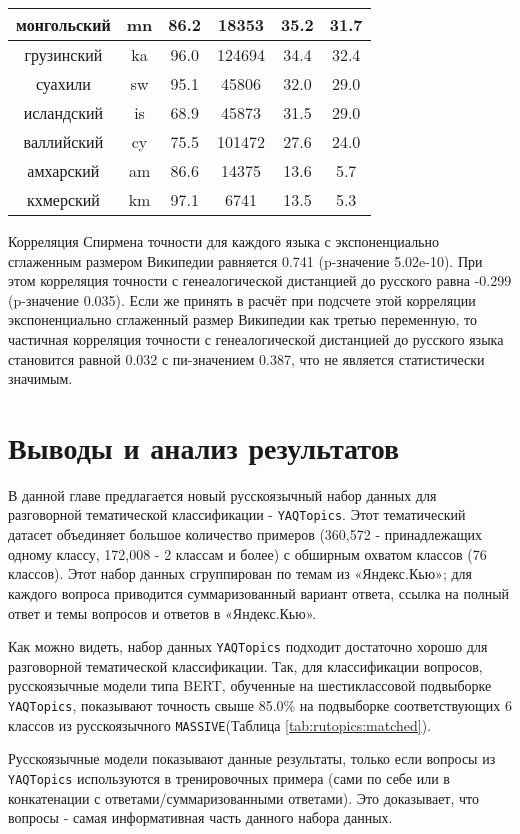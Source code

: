 \begin{table*}
{\begin{tabular}{|c|c|c||c|c|c|}
монгольский & mn & 86.2 & 18353 & 35.2 & 31.7\\ \hline
грузинский & ka & 96.0 & 124694 & 34.4 & 32.4\\ \hline
суахили & sw & 95.1 & 45806 & 32.0 & 29.0\\ \hline
исландский & is & 68.9 & 45873 & 31.5 & 29.0\\ \hline
валлийский & cy & 75.5 & 101472 & 27.6 & 24.0\\ \hline
амхарский & am & 86.6 & 14375 & 13.6 & 5.7\\ \hline
кхмерский & km & 97.1 & 6741 & 13.5 & 5.3\\ \hline
\end{tabular}
}
\end{table*}
Корреляция Спирмена точности для каждого языка с экспоненциально сглаженным размером Википедии равняется 0.741 (p-значение 5.02e-10). При этом корреляция точности с генеалогической дистанцией до русского равна -0.299 (p-значение 0.035). Если же принять в расчёт при подсчете этой корреляции экспоненциально сглаженный размер Википедии как третью переменную, то частичная корреляция точности с генеалогической дистанцией до русского языка становится равной 0.032 с пи-значением 0.387, что не является статистически значимым.


\section{Выводы и анализ результатов} 

В данной главе предлагается новый русскоязычный набор данных для разговорной тематической классификации - \texttt{YAQTopics}. Этот тематический датасет объединяет большое количество примеров (360,572 - принадлежащих одному классу, 172,008 - 2 классам и более) с обширным охватом классов (76 классов). Этот набор данных сгруппирован по темам из «Яндекс.Кью»; для каждого вопроса приводится суммаризованный вариант ответа, ссылка на полный ответ и темы вопросов и ответов в «Яндекс.Кью».

Как можно видеть, набор данных \texttt{YAQTopics} подходит достаточно хорошо для разговорной тематической классификации. Так, для классификации вопросов, русскоязычные модели типа BERT, обученные на шестиклассовой подвыборке \texttt{YAQTopics}, показывают точность свыше 85.0\% на подвыборке соответствующих 6 классов из русскоязычного \texttt{MASSIVE}(Таблица \ref{tab:rutopics:matched}). 

Русскоязычные модели показывают данные результаты, только если вопросы из  \texttt{YAQTopics} используются в тренировочных примера (сами по себе или в конкатенации с ответами/суммаризованными ответами). Это доказывает, что вопросы - самая информативная часть данного набора данных. 

